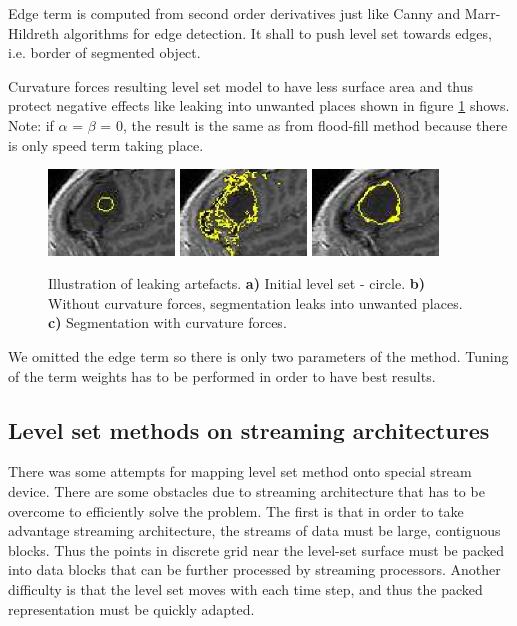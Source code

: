 Edge term is computed from second order derivatives just like Canny and Marr-Hildreth algorithms for edge detection.
It shall to push level set towards edges, i.e. border of segmented object.

Curvature forces resulting level set model to have less surface area and thus protect negative effects like leaking into unwanted places shown in figure \ref{fg:leaking} shows.
Note: if $\alpha$ = $\beta$ = 0, the result is the same as from flood-fill method because there is only speed term taking place.

\begin{figure}
    \centering
    \includegraphics[width=0.3\textwidth]{data/png/leaking1}
    \includegraphics[width=0.3\textwidth]{data/png/leaking2}
    \includegraphics[width=0.3\textwidth]{data/png/leaking3}
    \caption[Leaking]{Illustration of leaking artefacts.
    \textbf{a)} Initial level set - circle.
    \textbf{b)} Without curvature forces, segmentation leaks into unwanted places.
    \textbf{c)} Segmentation with curvature forces.
}
    \label{fg:leaking}
\end{figure}

We omitted the edge term so there is only two parameters of the method.
Tuning of the term weights has to be performed in order to have best results.

\subsection{Level set methods on streaming architectures}

\par
There was some attempts for mapping level set method onto special stream device.
There are some obstacles due to streaming architecture that has to be overcome to efficiently solve the problem.
The first is that in order to take advantage streaming architecture, the streams of data must be large, contiguous blocks.
Thus the points in discrete grid near the level-set surface must be packed into data blocks that can be further processed by streaming processors.
Another difficulty is that the level set moves with each time step, and thus the packed representation must be quickly adapted.

